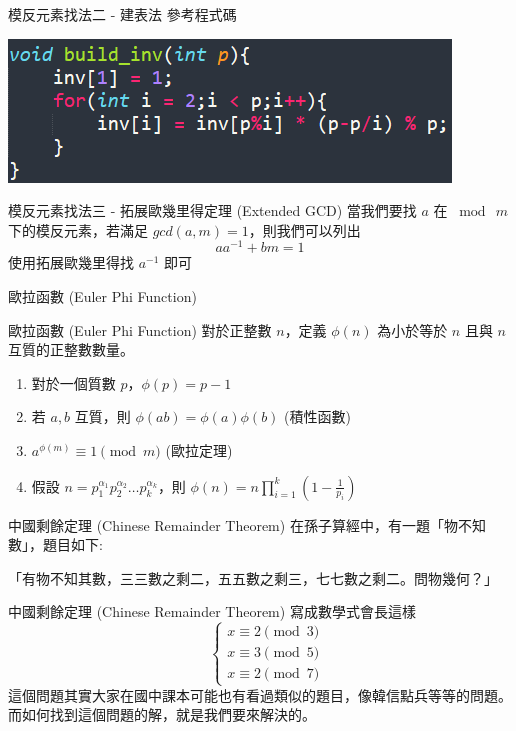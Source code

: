 \documentclass[aspectratio=169]{beamer}
\begin{document}
\begin{frame}{模反元素找法二 - 建表法}
    參考程式碼
    \begin{center}
        \includegraphics[]{images/code9.png}
    \end{center}
\end{frame}

\begin{frame}{模反元素找法三 - 拓展歐幾里得定理 (Extended GCD)}
    當我們要找 $a$ 在 $\bmod \ m$ 下的模反元素，若滿足 $gcd(a,m)=1$，則我們可以列出
    $$aa^{-1} + bm = 1$$
    使用拓展歐幾里得找 $a^{-1}$ 即可
\end{frame}

\begin{frame}{歐拉函數 (Euler Phi Function)}
    \begin{alertblock}{歐拉函數 (Euler Phi Function)}
        對於正整數 $n$，定義 $\phi(n)$ 為小於等於 $n$ 且與 $n$ 互質的正整數數量。
        \begin{enumerate}
            \item 對於一個質數 $p$，$\phi(p) = p-1$
            \item 若 $a,b$ 互質，則 $\phi(ab) = \phi(a) \phi(b)$ (積性函數)
            \item $a^{\phi(m)} \equiv 1 \pmod m$ (歐拉定理)
            \item 假設 $n=p_1^{\alpha_1}p_2^{\alpha_2}\dots p_k^{\alpha_k}$，則 $\phi(n) = n \prod_{i=1}^k (1-\frac{1}{p_i})$
        \end{enumerate}
    \end{alertblock}
\end{frame}

\begin{frame}{中國剩餘定理 (Chinese Remainder Theorem)}
    在孫子算經中，有一題「物不知數」，題目如下:
    \begin{center}
        「有物不知其數，三三數之剩二，五五數之剩三，七七數之剩二。問物幾何？」
    \end{center}
\end{frame}

\begin{frame}{中國剩餘定理 (Chinese Remainder Theorem)}
    寫成數學式會長這樣
    \begin{equation*}
        \quad \left\{ \begin{matrix} x \equiv 2 \pmod {3} \\ x \equiv 3 \pmod {5} \\ x \equiv 2 \pmod {7} \end{matrix} \right.
    \end{equation*} \pause
    這個問題其實大家在國中課本可能也有看過類似的題目，像韓信點兵等等的問題。 \\
    而如何找到這個問題的解，就是我們要來解決的。
\end{frame}
\end{document}
